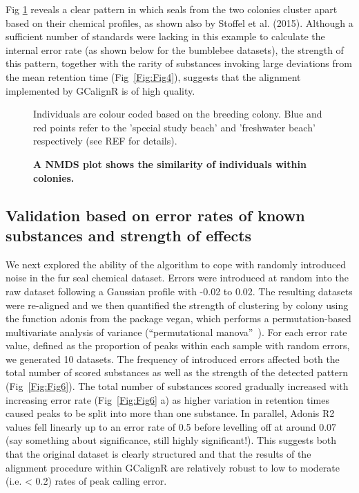 \documentclass[10pt,letterpaper]{article}
\begin{document}
Fig \ref{Fig:Fig5} reveals a clear pattern in which seals from the two colonies cluster apart based on their chemical profiles, as shown also by Stoffel et al. (2015). Although a sufficient number of standards were lacking in this example to calculate the internal error rate (as shown below for the bumblebee datasets), the strength of this pattern, together with the rarity of substances invoking large deviations from the mean retention time (Fig~\ref{Fig:Fig4}), suggests that the alignment implemented by GCalignR is of high quality.\par

\begin{figure}[htbp]
\centering
\caption{\textbf{A NMDS plot shows the similarity of individuals within colonies.}}
Individuals are colour coded based on the breeding colony. Blue and red points refer to the 'special study beach' and 'freshwater beach' respectively (see REF for details).
\label{Fig:Fig5}
\end{figure} 

\subsection*{Validation based on error rates of known substances and  strength of effects}

We next explored the ability of the algorithm to cope with randomly introduced noise in the fur seal chemical dataset.  Errors were introduced at random into the raw dataset following a Gaussian profile with -0.02 to 0.02.  The resulting datasets were re-aligned and we then quantified the strength of clustering by colony using the function adonis from the package vegan, which performs a permutation-based multivariate analysis of variance (“permutational manova”~\cite{Anderson.2001}). For each error rate value, defined as the proportion of peaks within each sample with random errors, we generated 10 datasets.  The frequency of introduced errors affected both the total number of scored substances as well as the strength of the detected pattern (Fig~\ref{Fig:Fig6}). The total number of substances scored gradually increased with increasing error rate (Fig~\ref{Fig:Fig6} a) as higher variation in retention times caused peaks to be split into more than one substance.  In parallel, Adonis R2 values fell linearly up to an error rate of 0.5 before levelling off at around 0.07 (say something about significance, still highly significant!).  This suggests both that the original dataset is clearly structured and that the results of the alignment procedure within GCalignR are relatively robust to low to moderate (i.e. < 0.2) rates of peak calling error.
\end{document}
